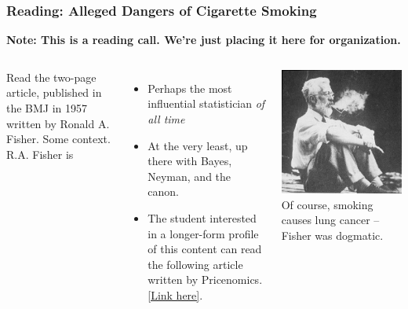 \documentclass[12pt, block=fill]{beamer}
\begin{document}
\begin{frame}
  \frametitle{Reading: Alleged Dangers of Cigarette Smoking}
  \textbf{Note: This is a reading call. We're just placing it here for
    organization.}

  \begin{columns}
    Read the two-page article, published in the BMJ in 1957 written by
    Ronald A. Fisher. Some context. R.A. Fisher is
    
    \begin{itemize}
    \item Perhaps the most influential statistician \textit{of all time}
    \item At the very least, up there with Bayes, Neyman, and the
      canon. 
    \item The student interested in a longer-form profile of this
      content can read the following article written by Pricenomics.
      \href{https://priceonomics.com/why-the-father-of-modern-statistics-didnt-believe/}{[Link
        here]}.
    \end{itemize}
    
    \includegraphics[width=\textwidth]{images/fisher.png}
    Of course, smoking causes lung cancer -- Fisher was dogmatic.
  \end{columns}
\end{frame}
\end{document}
